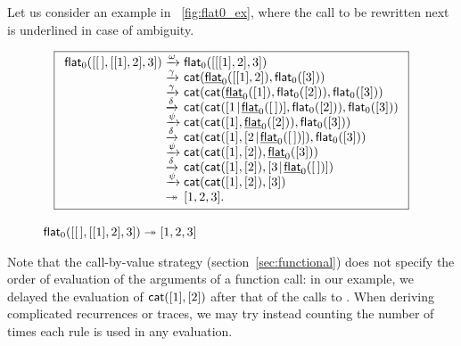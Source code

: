 Let us consider an example in \fig~\vref{fig:flat0_ex}, where the call
to be rewritten next is underlined in case of ambiguity.
\begin{figure}[t]
\begin{equation*}
\boxed{%
\begin{array}{r@{\;}l@{\;}l}
\fun{flat}_0([\el,[[1],2],3])
& \xrightarrow{\smash{\omega}}
& \fun{flat}_0([[[1],2],3])\\
& \xrightarrow{\smash{\gamma}}
& \fun{cat}(\ufun{flat}_0([[1],2]),\fun{flat}_0([3]))\\
& \xrightarrow{\smash{\gamma}}
& \fun{cat}(\fun{cat}(\ufun{flat}_0([1]),\fun{flat}_0([2])),\fun{flat}_0([3]))\\
& \xrightarrow{\smash{\delta}}
& \fun{cat}(\fun{cat}(\cons{1}{\ufun{flat}_0(\el)},\fun{flat}_0([2])),\fun{flat}_0([3]))\\
& \xrightarrow{\smash{\psi}}
& \fun{cat}(\fun{cat}([1],\ufun{flat}_0([2])),\fun{flat}_0([3]))\\
& \xrightarrow{\smash{\delta}}
& \fun{cat}(\fun{cat}([1],\cons{2}{\ufun{flat}_0(\el)}),\fun{flat}_0([3]))\\
& \xrightarrow{\smash{\psi}}
& \fun{cat}(\fun{cat}([1],[2]),\ufun{flat}_0([3]))\\
& \xrightarrow{\smash{\delta}}
& \fun{cat}(\fun{cat}([1],[2]),\cons{3}{\ufun{flat}_0(\el)})\\
& \xrightarrow{\smash{\psi}}
& \fun{cat}(\fun{cat}([1],[2]),[3])\\
& \twoheadrightarrow & [1,2,3].
\end{array}
}
\end{equation*}
\caption{\(\textsf{flat}_0([[\,],[[1],2],3]) \twoheadrightarrow [1,2,3]\)}
\label{fig:flat0_ex}
\end{figure}
Note that the call\hyp{}by\hyp{}value strategy (section~\ref{sec:functional}) does
not specify the order of evaluation of the arguments of a function
call: in our example, we delayed the evaluation of
\(\textsf{cat}([1],[2])\)  after that of the
calls to . When
deriving complicated recurrences or traces, we may try instead
counting the number of times each rule is used in any
evaluation.

